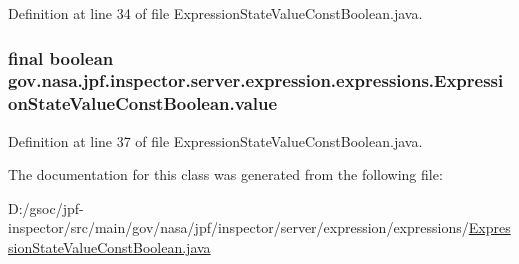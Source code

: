 Definition at line 34 of file Expression\+State\+Value\+Const\+Boolean.\+java.

\subsubsection[{\texorpdfstring{value}{value}}]{\setlength{\rightskip}{0pt plus 5cm}final boolean gov.\+nasa.\+jpf.\+inspector.\+server.\+expression.\+expressions.\+Expression\+State\+Value\+Const\+Boolean.\+value\hspace{0.3cm}{\ttfamily [private]}}\hypertarget{classgov_1_1nasa_1_1jpf_1_1inspector_1_1server_1_1expression_1_1expressions_1_1_expression_state_value_const_boolean_ade9702d2cd4df8d8a3f6ace0b0475fba}{}\label{classgov_1_1nasa_1_1jpf_1_1inspector_1_1server_1_1expression_1_1expressions_1_1_expression_state_value_const_boolean_ade9702d2cd4df8d8a3f6ace0b0475fba}


Definition at line 37 of file Expression\+State\+Value\+Const\+Boolean.\+java.



The documentation for this class was generated from the following file\+:\begin{DoxyCompactItemize}
\item 
D\+:/gsoc/jpf-\/inspector/src/main/gov/nasa/jpf/inspector/server/expression/expressions/\hyperlink{_expression_state_value_const_boolean_8java}{Expression\+State\+Value\+Const\+Boolean.\+java}\end{DoxyCompactItemize}
